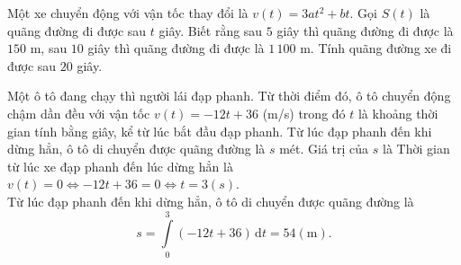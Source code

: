 \begin{ex}%
Một xe chuyển động với vận tốc thay đổi là $v(t)=3at^2+bt$. Gọi $S(t)$ là quãng đường đi được sau $t$ giây. Biết rằng sau $5$ giây thì quãng đường đi được là $150$ m, sau $10$ giây thì quãng đường đi được là $1\,100$ m. Tính quãng đường xe đi được sau $20$ giây.
\end{ex}

\begin{ex}%
Một ô tô đang chạy thì người lái đạp phanh. Từ thời điểm đó, ô tô chuyển động chậm dần đều với vận tốc $v(t)=-12 t+36$ (m/s) trong đó $t$ là khoảng thời gian tính bằng giây, kể từ lúc bắt đầu đạp phanh. Từ lúc đạp phanh đến khi dừng hẳn, ô tô di chuyển được quãng đường là $s$ mét. Giá trị của $s$ là
\loigiai
{Thời gian từ lúc xe đạp phanh đến lúc dừng hẳn là $v(t)=0 \Leftrightarrow-12 t+36=0 \Leftrightarrow t=3(s)$.\\
Từ lúc đạp phanh đến khi dừng hẳn, ô tô di chuyển được quãng đường là \[s=\displaystyle\int\limits_0^3(-12 t+36) \mathrm{\,d}t=54 (\text{m}).\]
}
\end{ex}

